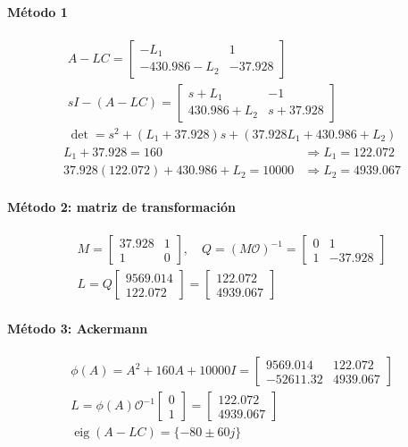 \documentclass[11pt]{article}
\begin{document}
\paragraph{Método 1}
\begin{gather*}
A-LC=\begin{bmatrix}-L_1&1\\-430.986-L_2&-37.928\end{bmatrix}\\
sI-(A-LC)=\begin{bmatrix}s+L_1&-1\\430.986+L_2&s+37.928\end{bmatrix}\\
\det=s^2+(L_1+37.928)s+(37.928L_1+430.986+L_2)
\end{gather*}
\begin{align*}
L_1+37.928=160&\Rightarrow L_1=122.072\\
37.928(122.072)+430.986+L_2=10000&\Rightarrow L_2=4939.067
\end{align*}
\paragraph{Método 2: matriz de transformación}
\begin{gather*}
M=\begin{bmatrix}37.928 & 1 \\ 1 & 0\end{bmatrix},\quad Q=(M\mathcal O)^{-1}=\begin{bmatrix}0 & 1 \\ 1 & -37.928\end{bmatrix}\\
L=Q\begin{bmatrix}9569.014 \\ 122.072\end{bmatrix}=\begin{bmatrix}122.072 \\ 4939.067\end{bmatrix}
\end{gather*}
\paragraph{Método 3: Ackermann}
\begin{gather*}
\phi(A)=A^2+160A+10000I=\begin{bmatrix}9569.014 & 122.072 \\ -52611.32 & 4939.067\end{bmatrix}\\
L=\phi(A)\mathcal O^{-1}\begin{bmatrix}0\\1\end{bmatrix}=\begin{bmatrix}122.072 \\ 4939.067\end{bmatrix}\\
\operatorname{eig}(A-LC)=\{-80\pm 60j\}
\end{gather*}
\end{document}
